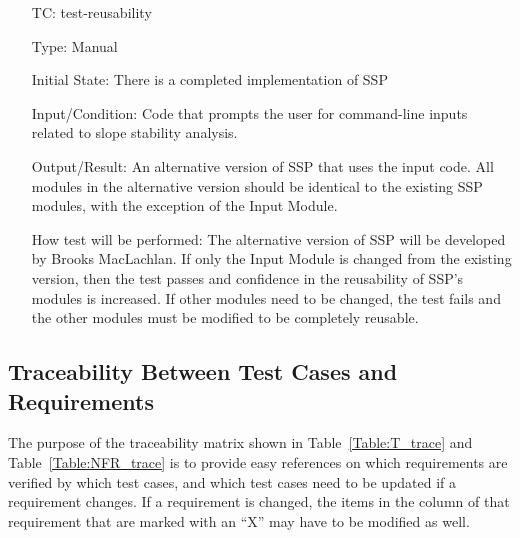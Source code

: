 \documentclass[12pt, titlepage]{article}
\newcounter{testnum} %
\newcommand{\progname}{SSP}
\begin{document}
\begin{enumerate}[label=TC\arabic*:,ref={\arabic*}]
	
\item [TC\refstepcounter{testnum}\thetestnum: \label{TC_Reusability}] 
test-reusability

Type: Manual

Initial State: There is a completed implementation of \progname{}
	
Input/Condition: Code that prompts the user for command-line inputs related to 
slope stability analysis.

Output/Result: An alternative version of \progname{} that uses the input code. 
All modules in the alternative version should be identical to the existing 
\progname{} modules, with the exception of the Input Module.

How test will be performed: The alternative version of \progname{} will be 
developed by Brooks MacLachlan. If only the Input Module is changed from the 
existing version, then the test passes and confidence in the reusability of 
\progname{}'s modules is increased. If other modules need to be changed, the 
test fails and the other modules must be modified to be completely reusable.
	
\end{enumerate}

\subsection{Traceability Between Test Cases and Requirements}

\noindent The purpose of the traceability matrix shown in 
Table~\ref{Table:T_trace} and Table~\ref{Table:NFR_trace} is to provide easy 
references on which requirements are verified by which test cases, and which 
test cases need to be updated if a requirement changes.  If a requirement is 
changed, the items in the column of that requirement that are marked
with an ``X'' may have to be modified as well. 
\end{document}
